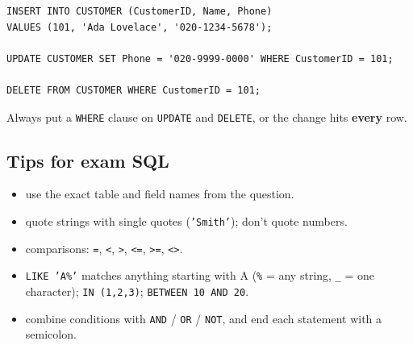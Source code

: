 \documentclass[11pt]{article}
\begin{document}
\begin{Verbatim}
INSERT INTO CUSTOMER (CustomerID, Name, Phone)
VALUES (101, 'Ada Lovelace', '020-1234-5678');

UPDATE CUSTOMER SET Phone = '020-9999-0000' WHERE CustomerID = 101;

DELETE FROM CUSTOMER WHERE CustomerID = 101;
\end{Verbatim}

Always put a \texttt{WHERE} clause on \texttt{UPDATE} and \texttt{DELETE}, or the change hits \textbf{every} row.

\subsection*{Tips for exam SQL}

\begin{itemize}
\item use the exact table and field names from the question.

\item quote strings with single quotes (\texttt{'Smith'}); don't quote numbers.

\item comparisons: \texttt{=}, \texttt{\textless{}}, \texttt{\textgreater{}}, \texttt{\textless{}=}, \texttt{\textgreater{}=}, \texttt{\textless{}\textgreater{}}.

\item \texttt{LIKE 'A\%'} matches anything starting with A (\texttt{\%} = any string, \texttt{\_} = one character); \texttt{IN (1,2,3)}; \texttt{BETWEEN 10 AND 20}.

\item combine conditions with \texttt{AND} / \texttt{OR} / \texttt{NOT}, and end each statement with a semicolon.

\end{itemize}
\end{document}
